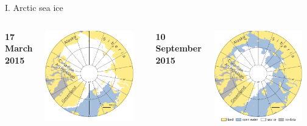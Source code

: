\documentclass[8pt]{beamer}
\begin{document}
\setwatermark{\fontsize{125pt}{125pt}\selectfont{}}
\begin{frame}[fragile]{I. Arctic sea ice}
	\begin{columns}
			\begin{center}
				\textbf{17 March 2015}
			\end{center}
			\includegraphics[width=0.9\textwidth]{./img/ArcticSI_Mar2015_SI_noLeg_names.pdf}\\
			
		\begin{center}
			\textbf{10 September 2015}
		\end{center}
			\includegraphics[width=0.9\textwidth]{./img/ArcticSI_Sep2015_SI_names.pdf}\\
	\end{columns}


\end{frame}
\end{document}
